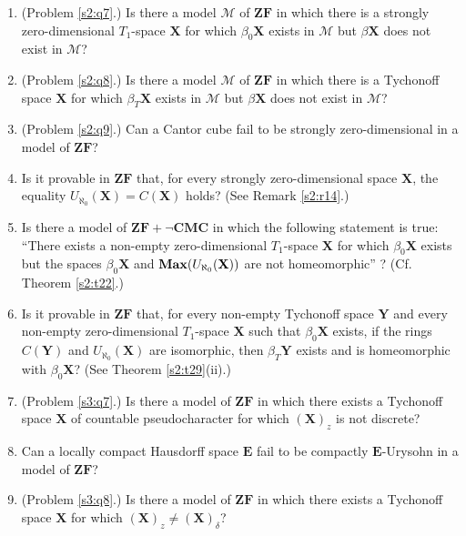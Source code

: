 \documentclass[12pt,twoside,leqno]{article}
\theoremstyle{plain}
\theoremstyle{definition}
\theoremstyle{remark}
\DeclareMathOperator{\BMax}{\bf{Max}}
\begin{document}
\begin{enumerate}
	\item  (Problem \ref{s2:q7}.) Is there a model $\mathcal{M}$ of $\mathbf{ZF}$ in which there is a strongly zero-dimensional $T_1$-space $\mathbf{X}$ for which $\beta_0\mathbf{X}$ exists in $\mathcal{M}$ but $\beta\mathbf{X}$ does not exist in $\mathcal{M}$? 
	
	\item  (Problem \ref{s2:q8}.) Is there a model $\mathcal{M}$ of $\mathbf{ZF}$ in which there is a Tychonoff space $\mathbf{X}$ for which $\beta_T\mathbf{X}$ exists in $\mathcal{M}$ but $\beta\mathbf{X}$ does not exist in $\mathcal{M}$? 
	
	\item (Problem \ref{s2:q9}.) Can a Cantor cube fail to be strongly zero-dimensional in a model of $\mathbf{ZF}$?
	
	\item Is it provable in $\mathbf{ZF}$ that, for every strongly zero-dimensional space $\mathbf{X}$, the equality $U_{\aleph_0}(\mathbf{X})=C(\mathbf{X})$ holds? (See Remark \ref{s2:r14}.)
	
	\item Is there a model of $\mathbf{ZF+\neg CMC}$ in which the following statement is true:  ``There exists a non-empty zero-dimensional $T_1$-space $\mathbf{X}$ for which $\beta_0\mathbf{X}$ exists but the spaces $\beta_0\mathbf{X}$ and $\BMax(U_{\aleph_0}(\mathbf{X}))$ are not homeomorphic'' ? (Cf. Theorem \ref{s2:t22}.)
	
	\item Is it provable in $\mathbf{ZF}$ that, for every non-empty Tychonoff space $\mathbf{Y}$ and every non-empty zero-dimensional $T_1$-space $\mathbf{X}$ such that $\beta_0\mathbf{X}$ exists, if the rings $C(\mathbf{Y})$ and $U_{\aleph_0}(\mathbf{X})$ are isomorphic, then $\beta_T\mathbf{Y}$ exists and is homeomorphic with $\beta_0\mathbf{X}$? (See Theorem \ref{s2:t29}(ii).)
	
	\item (Problem \ref{s3:q7}.) Is there a model of $\mathbf{ZF}$ in which there exists a Tychonoff space $\mathbf{X}$ of countable pseudocharacter for which $(\mathbf{X})_z$ is not discrete?
	
	\item Can a locally compact Hausdorff space $\mathbf{E}$ fail to be compactly $\mathbf{E}$-Urysohn in a model of $\mathbf{ZF}$?
	
	\item (Problem \ref{s3:q8}.) Is there a model of $\mathbf{ZF}$ in which there exists a Tychonoff space $\mathbf{X}$ for which $(\mathbf{X})_z\neq (\mathbf{X})_{\delta}$? 
	

\end{enumerate}
\end{document}
